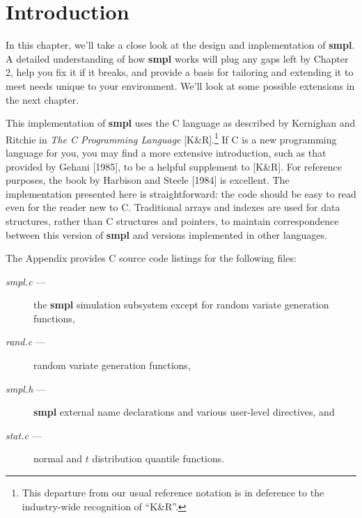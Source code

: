 \setcounter{chapter}{8}
\setcounter{section}{0}
\label{chap:implementing-smpl}
\section{Introduction}

In this chapter, we'll take a close look at the design and implementation
of \textbf{smpl}. A detailed understanding of how \textbf{smpl} works will plug any gaps left
by Chapter 2, help you fix it if it breaks, and provide a basis for tailoring
and extending it to meet needs unique to your environment. We'll look at
some possible extensions in the next chapter.

This implementation of \textbf{smpl} uses the C language as described by
Kernighan and Ritchie in \textit{The C Programming Language} [K\&R].\footnote{This departure from our usual reference notation is in deference to the industry-wide recognition of ``K\&R''.}
If C is a new programming language for you, you may find a more extensive
introduction, such as that provided by Gehani [1985], to be a helpful
supplement to [K\&R]. For reference purposes, the book by Harbison and
Steele [1984] is excellent. The implementation presented here is straightforward:
the code should be easy to read even for the reader new to C.
Traditional arrays and indexes are used for data structures, rather than C
structures and pointers, to maintain correspondence between this version of
\textbf{smpl} and versions implemented in other languages.

The Appendix provides C source code listings for the following files:
\begin{description}
\item[\textit{smpl.c} ---] the \textbf{smpl} simulation subsystem except for random variate generation functions,
\item[\textit{rand.c} ---] random variate generation functions,
\item[\textit{smpl.h} ---] \textbf{smpl} external name declarations and various user-level directives, and
\item[\textit{stat.c} ---] normal and $t$ distribution quantile functions.
\end{description}


